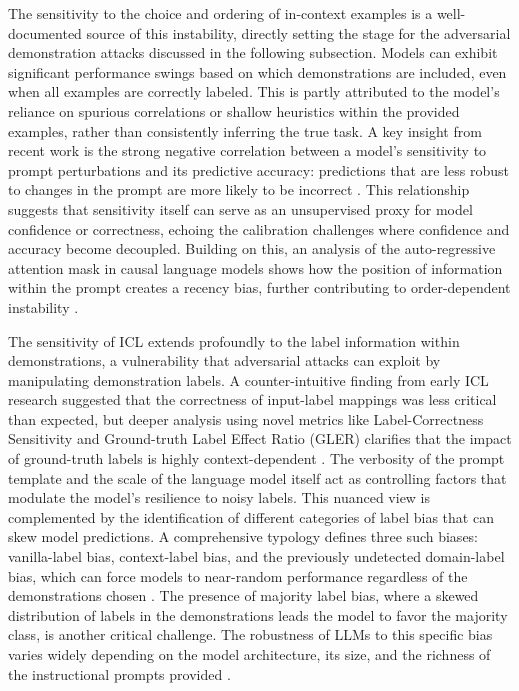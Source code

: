 \documentclass[11pt]{article}
\begin{document}
The sensitivity to the choice and ordering of in-context examples is a well-documented source of this instability, directly setting the stage for the adversarial demonstration attacks discussed in the following subsection. Models can exhibit significant performance swings based on which demonstrations are included, even when all examples are correctly labeled. This is partly attributed to the model's reliance on spurious correlations or shallow heuristics within the provided examples, rather than consistently inferring the true task. A key insight from recent work is the strong negative correlation between a model's sensitivity to prompt perturbations and its predictive accuracy: predictions that are less robust to changes in the prompt are more likely to be incorrect \cite{ref33,ref423}. This relationship suggests that sensitivity itself can serve as an unsupervised proxy for model confidence or correctness, echoing the calibration challenges where confidence and accuracy become decoupled. Building on this, an analysis of the auto-regressive attention mask in causal language models shows how the position of information within the prompt creates a recency bias, further contributing to order-dependent instability \cite{ref1}.

The sensitivity of ICL extends profoundly to the label information within demonstrations, a vulnerability that adversarial attacks can exploit by manipulating demonstration labels. A counter-intuitive finding from early ICL research suggested that the correctness of input-label mappings was less critical than expected, but deeper analysis using novel metrics like Label-Correctness Sensitivity and Ground-truth Label Effect Ratio (GLER) clarifies that the impact of ground-truth labels is highly context-dependent \cite{ref424}. The verbosity of the prompt template and the scale of the language model itself act as controlling factors that modulate the model's resilience to noisy labels. This nuanced view is complemented by the identification of different categories of label bias that can skew model predictions. A comprehensive typology defines three such biases: vanilla-label bias, context-label bias, and the previously undetected domain-label bias, which can force models to near-random performance regardless of the demonstrations chosen \cite{ref177}. The presence of majority label bias, where a skewed distribution of labels in the demonstrations leads the model to favor the majority class, is another critical challenge. The robustness of LLMs to this specific bias varies widely depending on the model architecture, its size, and the richness of the instructional prompts provided \cite{ref40}.
\end{document}
